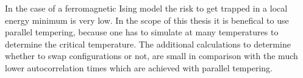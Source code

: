     In the case of a ferromagnetic Ising model the risk to get trapped
    in a local energy minimum is very low. In the scope of this thesis it is benefical
    to use parallel tempering, because one has to simulate at many temperatures
    to determine the critical temperature. The additional calculations
    to determine whether to swap configurations or not, are small in
    comparison with the much lower autocorrelation times which are
    achieved with parallel tempering.
